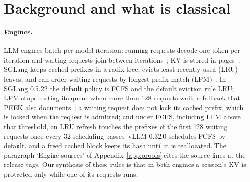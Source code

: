 \section{Background and what is classical}\label{sec:background}

\paragraph{Engines.}
LLM engines batch per model iteration: running requests decode one token per iteration and waiting requests join between iterations~\citep{yu2022orca}; KV is stored in pages~\citep{kwon2023vllm}. SGLang keeps cached prefixes in a radix tree, evicts least-recently-used (LRU) leaves, and can order waiting requests by longest prefix match (LPM)~\citep{zheng2024sglang}. In SGLang 0.5.22 the default policy is FCFS and the default eviction rule LRU; LPM stops sorting its queue when more than 128 requests wait, a fallback that PEEK also documents~\citep{xie2026peek}; a waiting request does not lock its cached prefix, which is locked when the request is admitted; and under FCFS, including LPM above that threshold, an LRU refresh touches the prefixes of the first 128 waiting requests once every 32 scheduling passes. vLLM 0.32.0 schedules FCFS by default, and a freed cached block keeps its hash until it is reallocated. The paragraph `Engine sources' of Appendix~\ref{app:proofs} cites the source lines at the release tags. Our synthesis of these rules is that in both engines a session's KV is protected only while one of its requests runs.

